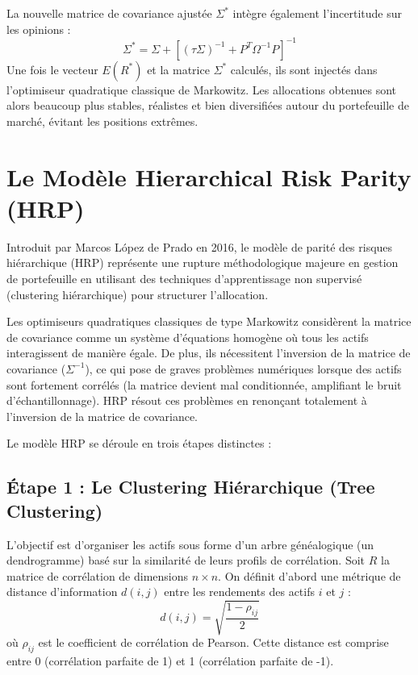 La nouvelle matrice de covariance ajustée $\Sigma^*$ intègre également l'incertitude sur les opinions :
\begin{equation}
    \Sigma^* = \Sigma + \left[ (\tau \Sigma)^{-1} + P^T \Omega^{-1} P \right]^{-1}
\end{equation}
Une fois le vecteur $E(R^*)$ et la matrice $\Sigma^*$ calculés, ils sont injectés dans l'optimiseur quadratique classique de Markowitz. Les allocations obtenues sont alors beaucoup plus stables, réalistes et bien diversifiées autour du portefeuille de marché, évitant les positions extrêmes.

\section{Le Modèle Hierarchical Risk Parity (HRP)}
Introduit par Marcos López de Prado en 2016, le modèle de parité des risques hiérarchique (HRP) représente une rupture méthodologique majeure en gestion de portefeuille en utilisant des techniques d'apprentissage non supervisé (clustering hiérarchique) pour structurer l'allocation.

Les optimiseurs quadratiques classiques de type Markowitz considèrent la matrice de covariance comme un système d'équations homogène où tous les actifs interagissent de manière égale. De plus, ils nécessitent l'inversion de la matrice de covariance ($\Sigma^{-1}$), ce qui pose de graves problèmes numériques lorsque des actifs sont fortement corrélés (la matrice devient mal conditionnée, amplifiant le bruit d'échantillonnage). HRP résout ces problèmes en renonçant totalement à l'inversion de la matrice de covariance.

Le modèle HRP se déroule en trois étapes distinctes :

\subsection{Étape 1 : Le Clustering Hiérarchique (Tree Clustering)}
L'objectif est d'organiser les actifs sous forme d'un arbre généalogique (un dendrogramme) basé sur la similarité de leurs profils de corrélation.
Soit $R$ la matrice de corrélation de dimensions $n \times n$. On définit d'abord une métrique de distance d'information $d(i, j)$ entre les rendements des actifs $i$ et $j$ :
\begin{equation}
    d(i, j) = \sqrt{\frac{1 - \rho_{ij}}{2}}
\end{equation}
où $\rho_{ij}$ est le coefficient de corrélation de Pearson. Cette distance est comprise entre 0 (corrélation parfaite de 1) et 1 (corrélation parfaite de -1).

